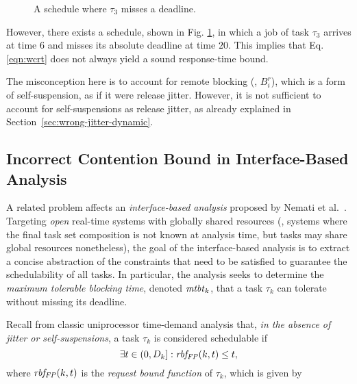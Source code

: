 \begin{figure}[t]
{}       
\caption{A schedule where $\tau_3$ misses a deadline.}
\label{fig:counterexample_protocol}
\end{figure}

\ifpaper
 \fi

However, there exists a schedule, shown in Fig. \ref{fig:counterexample_protocol}, in which a job of task $\tau_3$ arrives at time $6$ and misses its absolute deadline at time $20$. This implies that Eq. \eqref{eqn:wcrt} does not always yield a sound response-time bound. 

The misconception here is to account for remote blocking (\ie, $B_i^r$), which is a form of self-suspension, as if it were release jitter. However, it is not sufficient to account for self-suspensions as release jitter, as already explained in Section~\ref{sec:wrong-jitter-dynamic}.

\subsection{Incorrect Contention Bound in Interface-Based Analysis}

A related problem affects an \emph{interface-based analysis}  proposed by Nemati et al.~\cite{NBN:11}. Targeting \emph{open} real-time systems with globally shared resources (\ie, systems where the final task set composition is not known at analysis time, but tasks may share global resources nonetheless), the goal of the interface-based analysis is to extract a concise abstraction of the constraints that need to be satisfied  to guarantee the schedulability of all tasks. In particular, the analysis seeks to determine the \emph{maximum tolerable blocking time}, denoted $\mathit{mtbt}_k$, that a task $\tau_k$ can tolerate without missing its deadline. 

Recall from classic uniprocessor time-demand analysis \cite{lehoczky-1989} that, \emph{in the absence of jitter or self-suspensions}, a task $\tau_k$ is considered schedulable if
\begin{equation}
\label{eqn:rbf-1}
\exists t \in (0,D_k]: \mathit{rbf_{FP}}(k,t) \leq t, 
\end{equation}
where $\mathit{rbf_{FP}}(k,t)$ is the \emph{request bound function} of $\tau_k$, which is given by

